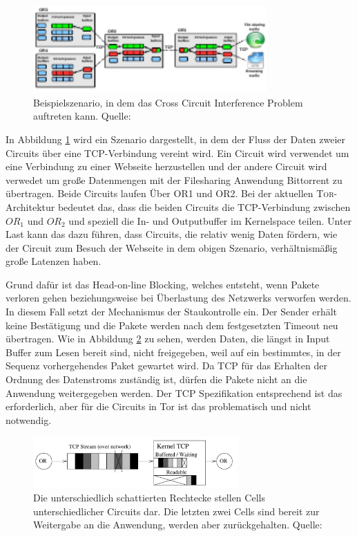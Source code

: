 \documentclass[fleqn,envcountsame,runningheads,10pt,a4paper]{llncs}
\begin{document}
\begin{figure}[h]
  \begin{center}
    \includegraphics[width=0.8\textwidth]{pics/BufferPic.pdf}
    \caption{Beispielszenario, in dem das Cross Circuit Interference Problem auftreten kann. Quelle: \cite{pctcp} }
    \label{fig:buffer} 
  \end{center} 
\end{figure} 

In Abbildung \ref{fig:buffer} wird ein Szenario dargestellt, in dem der Fluss der Daten zweier Circuits über eine TCP-Verbindung vereint wird. Ein Circuit wird verwendet um eine Verbindung zu einer Webseite herzustellen und der andere Circuit wird verwedet um große Datenmengen mit der Filesharing Anwendung Bittorrent zu übertragen. Beide Circuits laufen Über OR1 und OR2. Bei der aktuellen \textsc{Tor}-Architektur bedeutet das, dass die beiden Circuits die TCP-Verbindung zwischen $\textit{OR}_1$ und $\textit{OR}_2$ und speziell die In- und Outputbuffer im Kernelspace teilen. Unter Last kann das dazu führen, dass Circuits, die relativ wenig Daten fördern, wie der Circuit zum Besuch der Webseite in dem obigen Szenario, verhältnismäßig große Latenzen haben.


Grund dafür ist das Head-on-line Blocking, welches entsteht, wenn Pakete verloren gehen beziehungsweise bei Überlastung des Netzwerks verworfen werden. In diesem Fall setzt der Mechanismus der Staukontrolle ein. Der Sender erhält keine Bestätigung und die Pakete werden nach dem festgesetzten Timeout neu übertragen. Wie in Abbildung \ref{fig:headonline} zu sehen, werden Daten, die längst in Input Buffer zum Lesen bereit sind, nicht freigegeben, weil auf ein bestimmtes, in der Sequenz vorhergehendes Paket gewartet wird. Da TCP für das Erhalten der Ordnung des Datenstroms zuständig ist, dürfen die Pakete nicht an die Anwendung weitergegeben werden. Der TCP Spezifikation entsprechend ist das erforderlich, aber für die Circuits in Tor ist das problematisch und nicht notwendig.

\begin{figure}[h]
  \begin{center}
    \includegraphics[width=0.7\textwidth]{pics/headonlinevanilla.pdf}
    \caption{Die unterschiedlich schattierten Rechtecke stellen Cells unterschiedlicher Circuits dar. Die letzten zwei Cells sind bereit zur Weitergabe an die Anwendung, werden aber zurückgehalten. Quelle: \cite{tcp-over-dtls}}
    \label{fig:headonline} 
  \end{center} 
\end{figure}
\end{document}
